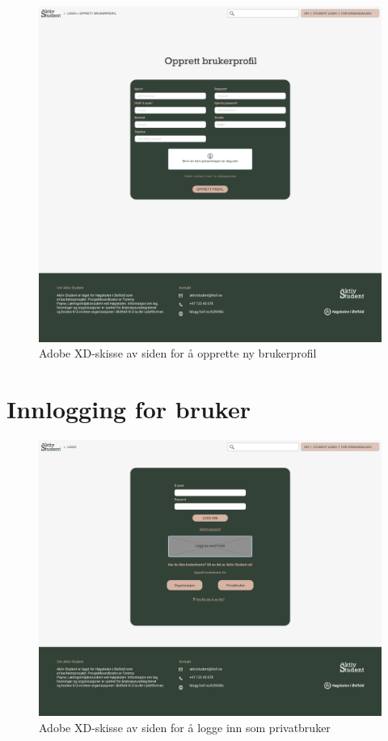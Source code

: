 \begin{figure}[H]
\centering
\includegraphics[width=\textwidth]{Illustrasjoner/Skisser-pdf/3.0/3-8-opprett-brukerprofil.pdf}
\caption{Adobe XD-skisse av siden for å opprette ny brukerprofil}
\label{vedlegg:3-8-opprett-brukerprofil}
\end{figure}

\section{Innlogging for bruker}

\begin{figure}[H]
\centering
\includegraphics[width=\textwidth]{Illustrasjoner/Skisser-pdf/3.0/3-9-logg-inn.pdf}
\caption{Adobe XD-skisse av siden for å logge inn som privatbruker}
\label{vedlegg:3-9-innlogging-bruker}
\end{figure}


